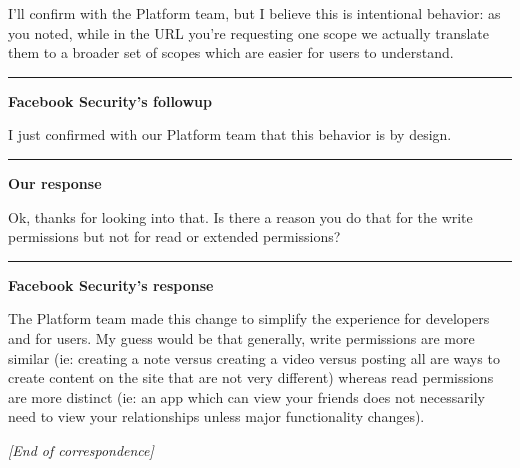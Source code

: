 \documentclass{sig-alternate}
\begin{document}
\noindent I'll confirm with the Platform team, but I believe this is intentional behavior: as you noted, while in the URL you're requesting one scope we actually translate them to a broader set of scopes which are easier for users to understand.

\noindent\rule{6cm}{0.4pt}

\noindent\textbf{Facebook Security's followup}

\noindent I just confirmed with our Platform team that this behavior is by design.

\noindent\rule{6cm}{0.4pt}

\noindent\textbf{Our response}

\noindent Ok, thanks for looking into that. Is there a reason you do that for the write permissions but not for read or extended permissions?

\noindent\rule{6cm}{0.4pt}

\noindent\textbf{Facebook Security's response}

\noindent The Platform team made this change to simplify the experience for developers and for users. My guess would be that generally, write permissions are more similar (ie: creating a note versus creating a video versus posting all are ways to create content on the site that are not very different) whereas read permissions are more distinct (ie: an app which can view your friends does not necessarily need to view your relationships unless major functionality changes).

\noindent \textit{[End of correspondence]}
\end{document}
